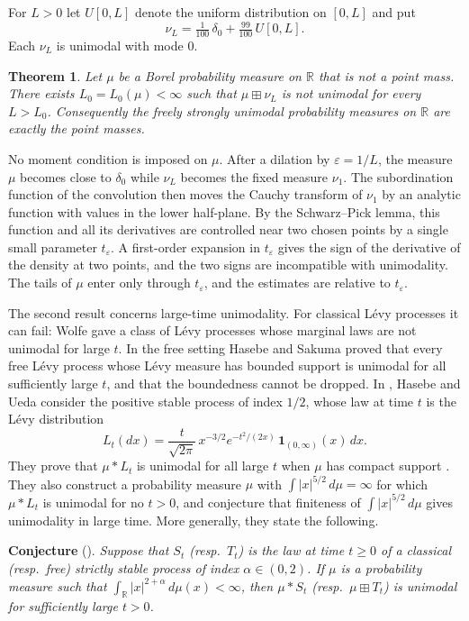 \documentclass[11pt]{amsart}
\numberwithin{equation}{section}
\newtheorem{theorem}{Theorem}[section]
\theoremstyle{definition}
\theoremstyle{remark}
\newcommand{\R}{\mathbb R}
\begin{document}
For $L>0$ let $U[0,L]$ denote the uniform distribution on $[0,L]$ and put
\[
\nu_L=\tfrac1{100}\,\delta_0+\tfrac{99}{100}\,U[0,L].
\]
Each $\nu_L$ is unimodal with mode $0$.

\begin{theorem}\label{thm:free}
Let $\mu$ be a Borel probability measure on $\R$ that is not a point mass. There exists $L_0=L_0(\mu)<\infty$ such that $\mu\boxplus\nu_L$ is not unimodal for every $L>L_0$. Consequently the freely strongly unimodal probability measures on $\R$ are exactly the point masses.
\end{theorem}

No moment condition is imposed on $\mu$. After a dilation by $\varepsilon=1/L$, the measure $\mu$ becomes close to $\delta_0$ while $\nu_L$ becomes the fixed measure $\nu_1$. The subordination function of the convolution then moves the Cauchy transform of $\nu_1$ by an analytic function with values in the lower half-plane. By the Schwarz--Pick lemma, this function and all its derivatives are controlled near two chosen points by a single small parameter $t_\varepsilon$. A first-order expansion in $t_\varepsilon$ gives the sign of the derivative of the density at two points, and the two signs are incompatible with unimodality. The tails of $\mu$ enter only through $t_\varepsilon$, and the estimates are relative to $t_\varepsilon$.

The second result concerns large-time unimodality. For classical L\'evy processes it can fail: Wolfe \cite{W78} gave a class of L\'evy processes whose marginal laws are not unimodal for large $t$. In the free setting Hasebe and Sakuma \cite{HS17} proved that every free L\'evy process whose L\'evy measure has bounded support is unimodal for all sufficiently large $t$, and that the boundedness cannot be dropped. In \cite[Section~5.2]{HU}, Hasebe and Ueda consider the positive stable process of index $1/2$, whose law at time $t$ is the L\'evy distribution
\[
L_t(dx)=\frac{t}{\sqrt{2\pi}}\,x^{-3/2}e^{-t^2/(2x)}\,\mathbf 1_{(0,\infty)}(x)\,dx .
\]
They prove that $\mu\ast L_t$ is unimodal for all large $t$ when $\mu$ has compact support \cite[Theorem~5.3]{HU}. They also construct a probability measure $\mu$ with $\int|x|^{5/2}\,d\mu=\infty$ for which $\mu\ast L_t$ is unimodal for no $t>0$, and conjecture that finiteness of $\int|x|^{5/2}\,d\mu$ gives unimodality in large time. More generally, they state the following.

\medskip
\noindent\textbf{Conjecture} (\cite[Conjecture~5.5]{HU}). \emph{Suppose that $S_t$ (resp.\ $T_t$) is the law at time $t\ge0$ of a classical (resp.\ free) strictly stable process of index $\alpha\in(0,2)$. If $\mu$ is a probability measure such that $\int_\R|x|^{2+\alpha}\,d\mu(x)<\infty$, then $\mu\ast S_t$ (resp.\ $\mu\boxplus T_t$) is unimodal for sufficiently large $t>0$.}
\medskip
\end{document}
